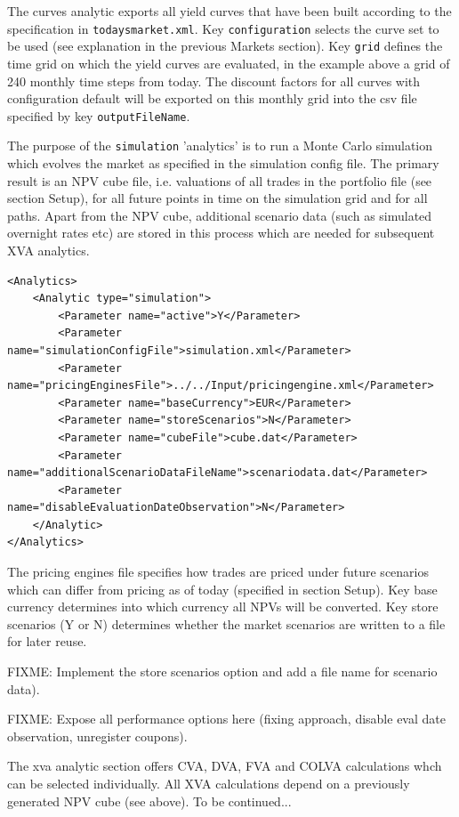 \documentclass[12pt, a4paper]{article}
\begin{document}
The curves analytic exports all yield curves that have been built according to the specification in {\tt todaysmarket.xml}. Key {\tt configuration} selects the curve set to be used (see explanation in the previous Markets section).  Key {\tt grid} defines the time grid on which the yield curves are evaluated, in the example above a grid of 240 monthly time steps from today. The discount factors for all curves with configuration default will be exported on this monthly grid into the csv file specified by key {\tt outputFileName}.

\medskip
The purpose of the {\tt simulation} 'analytics' is to run a Monte Carlo simulation which evolves the market as specified in the simulation config file. The primary result is an NPV cube file, i.e. valuations of all trades in the portfolio file (see section Setup), for all future points in time on the simulation grid and for all paths. Apart from the NPV cube, additional scenario data (such as simulated overnight rates etc) are stored in this process which are needed for subsequent XVA analytics.  

\begin{lstlisting}[caption={ORE analytic: simulation},
 	label=lst:ore_simulation]
<Analytics>
	<Analytic type="simulation">
		<Parameter name="active">Y</Parameter>
		<Parameter name="simulationConfigFile">simulation.xml</Parameter>
		<Parameter name="pricingEnginesFile">../../Input/pricingengine.xml</Parameter>
		<Parameter name="baseCurrency">EUR</Parameter>
		<Parameter name="storeScenarios">N</Parameter>
		<Parameter name="cubeFile">cube.dat</Parameter>
		<Parameter name="additionalScenarioDataFileName">scenariodata.dat</Parameter>
		<Parameter name="disableEvaluationDateObservation">N</Parameter>
	</Analytic>
</Analytics>      
\end{lstlisting}

The pricing engines file specifies how trades are priced under future scenarios which can differ from pricing as of today (specified in section Setup).
Key base currency determines into which currency all NPVs will be converted. Key store scenarios (Y or N) determines whether the market scenarios are written to a file for later reuse.

{\color{red}FIXME: Implement the store scenarios option and add a file name for scenario data}). 

{\color{red}FIXME: Expose all performance options here (fixing approach, disable eval date observation, unregister coupons)}. 

\medskip
The xva analytic section offers CVA, DVA, FVA and COLVA calculations whch can be selected individually. All XVA calculations depend on a previously generated NPV cube (see above). To be continued... 
\end{document}
